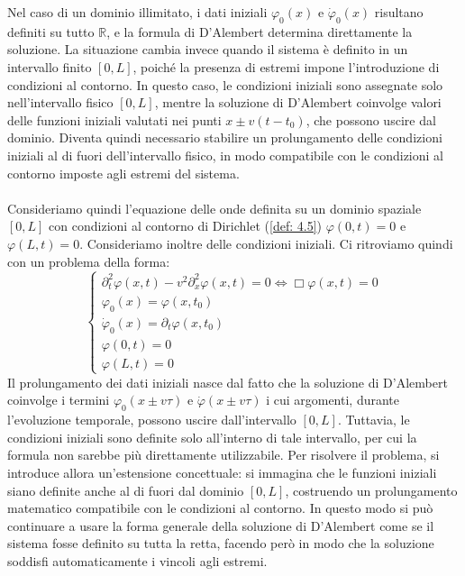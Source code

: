 \documentclass[a4paper,12pt]{report}
\begin{document}
Nel caso di un dominio illimitato, i dati iniziali $\varphi_0(x)$ e $\dot{\varphi}_0(x)$ risultano definiti su tutto $\mathbb{R}$, e la formula di D’Alembert determina direttamente la soluzione. La situazione cambia invece quando il sistema è definito in un intervallo finito $[0,L]$, poiché la presenza di estremi impone l’introduzione di condizioni al contorno. In questo caso, le condizioni iniziali sono assegnate solo nell’intervallo fisico $[0,L]$, mentre la soluzione di D’Alembert coinvolge valori delle funzioni iniziali valutati nei punti $x\pm v(t-t_0)$, che possono uscire dal dominio. Diventa quindi necessario stabilire un prolungamento delle condizioni iniziali al di fuori dell’intervallo fisico, in modo compatibile con le condizioni al contorno imposte agli estremi del sistema.
\\
\\ Consideriamo quindi l'equazione delle onde definita su un dominio spaziale $[0,L]$ con condizioni al contorno di Dirichlet (\ref{def: 4.5}) $\varphi(0,t)=0$ e $\varphi(L,t)=0$. Consideriamo inoltre delle condizioni iniziali. Ci ritroviamo quindi con un problema della forma:
\[\begin{cases}
    \partial_t^2\varphi(x,t)-v^2\partial_x^2\varphi(x,t)=0\iff \Box\varphi(x,t)=0
    \\\varphi_0(x)=\varphi(x,t_0)
    \\\dot{\varphi}_0(x)=\partial_t\varphi(x,t_0)
    \\\varphi(0,t)=0
    \\\varphi(L,t)=0
\end{cases}\]
Il prolungamento dei dati iniziali nasce dal fatto che la soluzione di D’Alembert coinvolge i termini $\varphi_0(x\pm v\tau)$ e $\dot{\varphi}(x\pm v\tau)$ i cui argomenti, durante l’evoluzione temporale, possono uscire dall’intervallo $[0,L]$. Tuttavia, le condizioni iniziali sono definite solo all’interno di tale intervallo, per cui la formula non sarebbe più direttamente utilizzabile. Per risolvere il problema, si introduce allora un’estensione concettuale: si immagina che le funzioni iniziali siano definite anche al di fuori dal dominio $[0,L]$, costruendo un prolungamento matematico compatibile con le condizioni al contorno. In questo modo si può continuare a usare la forma generale della soluzione di D’Alembert come se il sistema fosse definito su tutta la retta, facendo però in modo che la soluzione soddisfi automaticamente i vincoli agli estremi.
\end{document}
